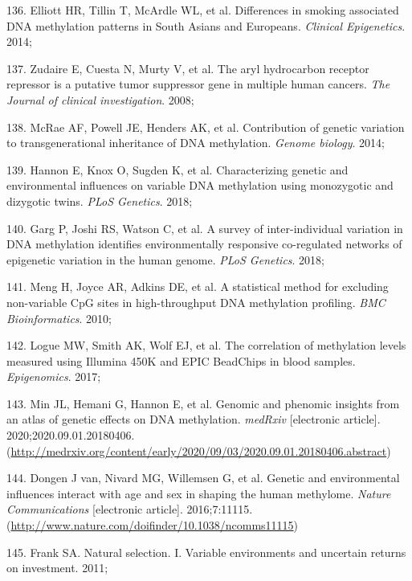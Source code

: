 \documentclass[11pt,oneside]{bristolthesis}
\newenvironment{cslreferences}%
  {}%
  {\par}
\begin{document}
\begin{cslreferences}
\leavevmode\hypertarget{ref-Elliott2014}{}%
136. Elliott HR, Tillin T, McArdle WL, et al. Differences in smoking associated DNA methylation patterns in South Asians and Europeans. \emph{Clinical Epigenetics}. 2014;

\leavevmode\hypertarget{ref-Zudaire2008}{}%
137. Zudaire E, Cuesta N, Murty V, et al. The aryl hydrocarbon receptor repressor is a putative tumor suppressor gene in multiple human cancers. \emph{The Journal of clinical investigation}. 2008;

\leavevmode\hypertarget{ref-McRae2014}{}%
138. McRae AF, Powell JE, Henders AK, et al. Contribution of genetic variation to transgenerational inheritance of DNA methylation. \emph{Genome biology}. 2014;

\leavevmode\hypertarget{ref-Hannon2018}{}%
139. Hannon E, Knox O, Sugden K, et al. Characterizing genetic and environmental influences on variable DNA methylation using monozygotic and dizygotic twins. \emph{PLoS Genetics}. 2018;

\leavevmode\hypertarget{ref-Garg2018}{}%
140. Garg P, Joshi RS, Watson C, et al. A survey of inter-individual variation in DNA methylation identifies environmentally responsive co-regulated networks of epigenetic variation in the human genome. \emph{PLoS Genetics}. 2018;

\leavevmode\hypertarget{ref-Meng2010}{}%
141. Meng H, Joyce AR, Adkins DE, et al. A statistical method for excluding non-variable CpG sites in high-throughput DNA methylation profiling. \emph{BMC Bioinformatics}. 2010;

\leavevmode\hypertarget{ref-Logue2017}{}%
142. Logue MW, Smith AK, Wolf EJ, et al. The correlation of methylation levels measured using Illumina 450K and EPIC BeadChips in blood samples. \emph{Epigenomics}. 2017;

\leavevmode\hypertarget{ref-Min2020}{}%
143. Min JL, Hemani G, Hannon E, et al. Genomic and phenomic insights from an atlas of genetic effects on DNA methylation. \emph{medRxiv} {[}electronic article{]}. 2020;2020.09.01.20180406. (\url{http://medrxiv.org/content/early/2020/09/03/2020.09.01.20180406.abstract})

\leavevmode\hypertarget{ref-VanDongen2016}{}%
144. Dongen J van, Nivard MG, Willemsen G, et al. Genetic and environmental influences interact with age and sex in shaping the human methylome. \emph{Nature Communications} {[}electronic article{]}. 2016;7:11115. (\url{http://www.nature.com/doifinder/10.1038/ncomms11115})

\leavevmode\hypertarget{ref-Frank2011}{}%
145. Frank SA. Natural selection. I. Variable environments and uncertain returns on investment. 2011;


\end{cslreferences}
\end{document}
